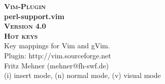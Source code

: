 \documentclass[oneside,10pt,landscape,DIV16]{scrartcl}
\newcommand{\Pluginversion}{4.0}
\begin{document}
%

\begin{multicols}{3}
%
\begin{center}
%
\textbf{\textsc{\small{Vim-Plugin}}}\\
\textbf{\LARGE{perl-support.vim}}\\
\textbf{\textsc{\small{Version \Pluginversion}}}\\
\vspace{5mm}%
\textbf{\textsc{\Huge{Hot keys}}}\\ 
\vspace{5mm}%
Key mappings for Vim and gVim.\\
Plugin: http://vim.sourceforge.net\\
Fritz Mehner (mehner@fh-swf.de)\\
\vspace{1.0mm}
{\normalsize (i)} insert mode, {\normalsize (n)} normal mode, {\normalsize (v)} visual mode\\
\vspace{4.0mm}


\end{center}
\end{multicols}
\end{document}
